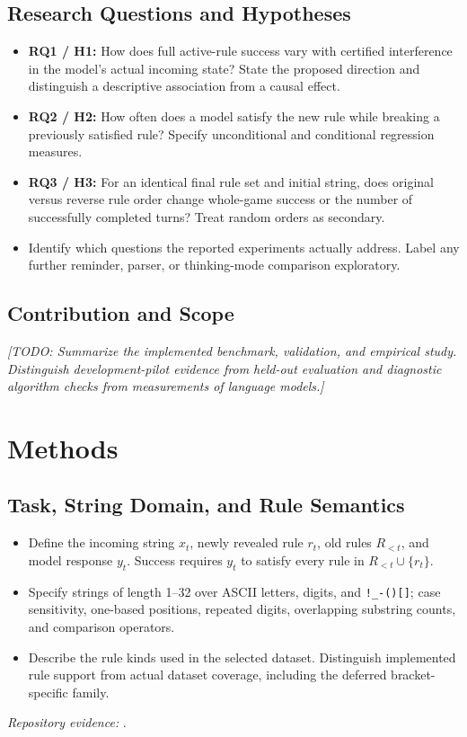 \documentclass[11pt]{article}
\newcommand{\todo}[1]{\textit{[TODO: #1]}}
\newcommand{\sourcefile}[1]{\par\noindent\textit{Repository evidence:} \path{#1}.\par}
\begin{document}
\subsection{Research Questions and Hypotheses}
\begin{itemize}
  \item \textbf{RQ1 / H1:} How does full active-rule success vary with certified
  interference in the model's actual incoming state? State the proposed direction
  and distinguish a descriptive association from a causal effect.
  \item \textbf{RQ2 / H2:} How often does a model satisfy the new rule while
  breaking a previously satisfied rule? Specify unconditional and conditional
  regression measures.
  \item \textbf{RQ3 / H3:} For an identical final rule set and initial string,
  does original versus reverse rule order change whole-game success or the
  number of successfully completed turns? Treat random orders as secondary.
  \item Identify which questions the reported experiments actually address.
  Label any further reminder, parser, or thinking-mode comparison exploratory.
\end{itemize}

\subsection{Contribution and Scope}
\todo{Summarize the implemented benchmark, validation, and empirical study.
Distinguish development-pilot evidence from held-out evaluation and diagnostic
algorithm checks from measurements of language models.}

\section{Methods}
\label{sec:methods}

\subsection{Task, String Domain, and Rule Semantics}
\begin{itemize}
  \item Define the incoming string $x_t$, newly revealed rule $r_t$, old rules
  $R_{<t}$, and model response $y_t$. Success requires $y_t$ to satisfy every
  rule in $R_{<t}\cup\{r_t\}$.
  \item Specify strings of length 1--32 over ASCII letters, digits, and
  \verb|!_-()[]|; case sensitivity, one-based positions, repeated digits,
  overlapping substring counts, and comparison operators.
  \item Describe the rule kinds used in the selected dataset. Distinguish
  implemented rule support from actual dataset coverage, including the deferred
  bracket-specific family.
\end{itemize}
\sourcefile{src/passgame/constraints.py}
\end{document}
